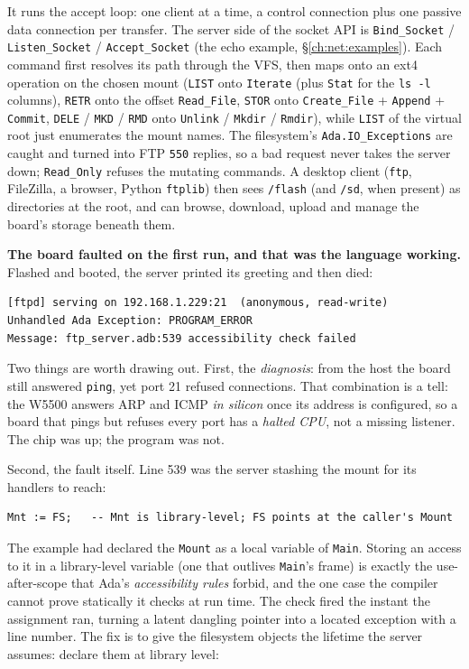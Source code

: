 It runs the accept loop: one client at a time, a control connection plus one
passive data connection per transfer. The server side of the socket API is
\texttt{Bind\_Socket} / \texttt{Listen\_Socket} / \texttt{Accept\_Socket} (the echo
example, \S\ref{ch:net:examples}). Each command first resolves its path through the
VFS, then maps onto an ext4 operation on the chosen mount (\texttt{LIST} onto
\texttt{Iterate} (plus \texttt{Stat} for the \texttt{ls -l} columns), \texttt{RETR}
onto the offset \texttt{Read\_File}, \texttt{STOR} onto \texttt{Create\_File} +
\texttt{Append} + \texttt{Commit}, \texttt{DELE} / \texttt{MKD} / \texttt{RMD} onto
\texttt{Unlink} / \texttt{Mkdir} / \texttt{Rmdir}), while \texttt{LIST} of the
virtual root just enumerates the mount names. The filesystem's
\texttt{Ada.IO\_Exceptions} are caught and turned into FTP \texttt{550} replies, so
a bad request never takes the server down; \texttt{Read\_Only} refuses the mutating
commands. A desktop client (\texttt{ftp}, FileZilla, a browser, Python
\texttt{ftplib}) then sees \texttt{/flash} (and \texttt{/sd}, when present) as
directories at the root, and can browse, download, upload and manage the board's
storage beneath them.

\textbf{The board faulted on the first run, and that was the language working.}
Flashed and booted, the server printed its greeting and then died:

\begin{lstlisting}[style=sh]
[ftpd] serving on 192.168.1.229:21  (anonymous, read-write)
Unhandled Ada Exception: PROGRAM_ERROR
Message: ftp_server.adb:539 accessibility check failed
\end{lstlisting}

Two things are worth drawing out. First, the \emph{diagnosis}: from the host the
board still answered \texttt{ping}, yet port 21 refused connections. That
combination is a tell: the W5500 answers ARP and ICMP \emph{in silicon} once its
address is configured, so a board that pings but refuses every port has a
\emph{halted CPU}, not a missing listener. The chip was up; the program was not.

Second, the fault itself. Line 539 was the server stashing the mount for its
handlers to reach:

\begin{lstlisting}
Mnt := FS;   -- Mnt is library-level; FS points at the caller's Mount
\end{lstlisting}

The example had declared the \texttt{Mount} as a local variable of \texttt{Main}.
Storing an access to it in a library-level variable (one that outlives
\texttt{Main}'s frame) is exactly the use-after-scope that Ada's
\emph{accessibility rules} forbid, and the one case the compiler cannot prove
statically it checks at run time. The check fired the instant the assignment ran,
turning a latent dangling pointer into a located exception with a line number. The
fix is to give the filesystem objects the lifetime the server assumes: declare
them at library level:

